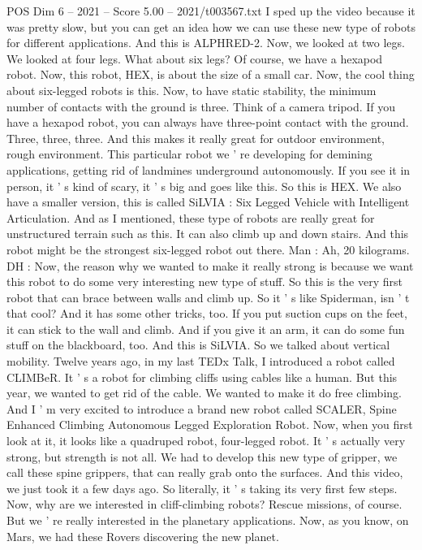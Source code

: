 \begin{textsample}{POS Dim 6 – 2021 – Score 5.00 – 2021/t003567.txt}
I sped up the video because it was pretty slow, but you can get an idea how we can use these new type of robots for different applications.
And this is ALPHRED-2.
Now, we looked at two legs.
We looked at four legs.
What about six legs?
Of course, we have a hexapod robot.
Now, this robot, HEX, is about the size of a small car.
Now, the cool thing about six-legged robots is this.
Now, to have static stability, the minimum number of contacts with the ground is three.
Think of a camera tripod.
If you have a hexapod robot, you can always have three-point contact with the ground.
Three, three, three.
And this makes it really great for outdoor environment, rough environment.
This particular robot we ' re developing for demining applications, getting rid of landmines underground autonomously.
If you see it in person, it ' s kind of scary, it ' s big and goes like this.
So this is HEX.
We also have a smaller version, this is called SiLVIA : Six Legged Vehicle with Intelligent Articulation.
And as I mentioned, these type of robots are really great for unstructured terrain such as this.
It can also climb up and down stairs.
And this robot might be the strongest six-legged robot out there.
Man : Ah, 20 kilograms.
DH : Now, the reason why we wanted to make it really strong is because we want this robot to do some very interesting new type of stuff.
So this is the very first robot that can brace between walls and climb up.
So it ' s like Spiderman, isn ' t that cool?
And it has some other tricks, too.
If you put suction cups on the feet, it can stick to the wall and climb.
And if you give it an arm, it can do some fun stuff on the blackboard, too.
And this is SiLVIA.
So we talked about vertical mobility.
Twelve years ago, in my last TEDx Talk, I introduced a robot called CLIMBeR.
It ' s a robot for climbing cliffs using cables like a human.
But this year, we wanted to get rid of the cable.
We wanted to make it do free climbing.
And I ' m very excited to introduce a brand new robot called SCALER, Spine Enhanced Climbing Autonomous Legged Exploration Robot.
Now, when you first look at it, it looks like a quadruped robot, four-legged robot.
It ' s actually very strong, but strength is not all.
We had to develop this new type of gripper, we call these spine grippers, that can really grab onto the surfaces.
And this video, we just took it a few days ago.
So literally, it ' s taking its very first few steps.
Now, why are we interested in cliff-climbing robots?
Rescue missions, of course.
But we ' re really interested in the planetary applications.
Now, as you know, on Mars, we had these Rovers discovering the new planet.

\end{textsample}
